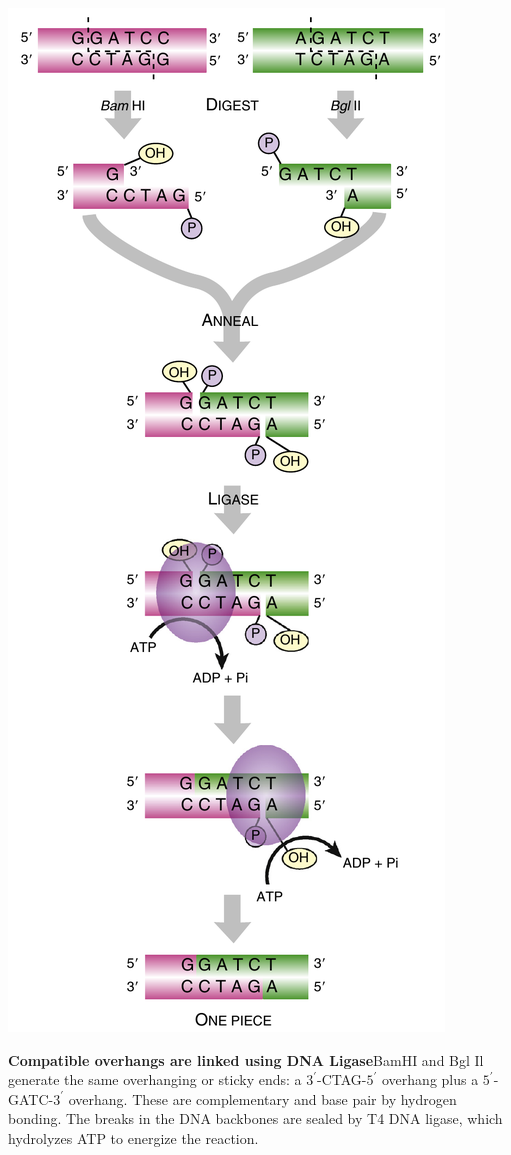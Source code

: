 \documentclass[nofonts,]{tufte-handout}
\begin{document}
\begin{marginfigure}
\includegraphics[width=0.95\linewidth]{./images/restriction_ligation} \caption[\textbf{Compatible overhangs are linked using DNA Ligase}\newline BamHI and Bgl Il generate the same overhanging or sticky ends]{\textbf{Compatible overhangs are linked using DNA Ligase}\newline BamHI and Bgl Il generate the same overhanging or sticky ends: a $3^\prime$-CTAG-$5^\prime$ overhang plus a $5^\prime$-GATC-$3^\prime$ overhang. These are complementary and base pair by hydrogen bonding. The breaks in the DNA backbones are sealed by T4 DNA ligase, which hydrolyzes ATP to energize the reaction.}\label{fig:restriction-ligation}

\end{marginfigure}
\end{document}

